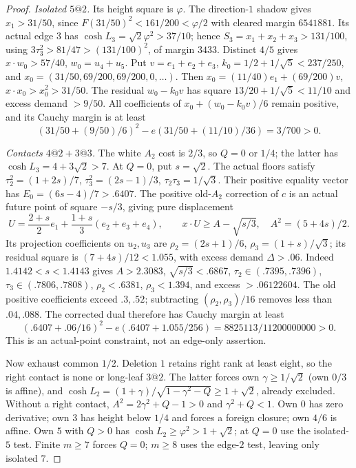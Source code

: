 \documentclass[11pt]{article}
\theoremstyle{remark}
\newcommand{\ph}{\varphi}
\begin{document}
\begin{proof}
\emph{Isolated $5@2$.}
Its height square is $\ph$. The direction-$1$ shadow gives
$x_1>31/50$, since $F(31/50)^2<161/200<\ph/2$ with cleared
margin $6541881$. Its actual edge $3$ has
$\cosh L_3=\sqrt2\ph^2>37/10$; hence
$S_3=x_1+x_2+x_3>131/100$, using
$3\tau_3^2>81/47>(131/100)^2$, of margin $3433$.
Distinct $4/5$ gives $x\cdot w_0>57/40$, $w_0=u_4+u_5$.
Put $v=e_1+e_2+e_3$, $k_0=1/2+1/\sqrt5<237/250$, and
$x_0=(31/50,69/200,69/200,0,\ldots)$.
Then $x_0=(11/40)e_1+(69/200)v$, $x\cdot x_0>x_0^2>31/50$.
The residual $w_0-k_0v$ has square $13/20+1/\sqrt5<11/10$
and excess demand $>9/50$.
All coefficients of $x_0+(w_0-k_0v)/6$ remain positive, and its
Cauchy margin is at least
\[
 (31/50+(9/50)/6)^2-e(31/50+(11/10)/36)=3/700>0.
\]

\emph{Contacts $4@2+3@3$.}
The white $A_2$ cost is $2/3$, so $Q=0$ or $1/4$; the latter has
$\cosh L_3=4+3\sqrt2>7$. At $Q=0$, put $s=\sqrt2$.
The actual floors satisfy
$\tau_2^2=(1+2s)/7$, $\tau_3^2=(2s-1)/3$,
$\tau_2\tau_3=1/\sqrt3$.
Their positive equality vector has $E_0=(6s-4)/7>.6407$.
The positive old-$A_2$ correction of $c$ is an actual future point
of square $-s/3$, giving pure displacement
\[
 U=\frac{2+s}{2}e_1+\frac{1+s}{3}(e_2+e_3+e_4),\qquad
 x\cdot U\ge A-\sqrt{s/3},\quad A^2=(5+4s)/2.
\]
Its projection coefficients on $u_2,u_3$ are
$\rho_2=(2s+1)/6$, $\rho_3=(1+s)/\sqrt3$;
its residual square is $(7+4s)/12<1.055$, with excess demand
$\Delta>.06$.
Indeed $1.4142<s<1.4143$ gives $A>2.3083$,
$\sqrt{s/3}<.6867$, $\tau_2\in(.7395,.7396)$,
$\tau_3\in(.7806,.7808)$, $\rho_2<.6381$, $\rho_3<1.394$,
and excess $>.06122604$.
The old positive coefficients exceed $.3,.52$; subtracting
$(\rho_2,\rho_3)/16$ removes less than $.04,.088$.
The corrected dual therefore has Cauchy margin at least
\[
 (.6407+.06/16)^2-e(.6407+1.055/256)
       =8825113/11200000000>0.
\]
This is an actual-point constraint, not an edge-only assertion.

Now exhaust common $1/2$. Deletion $1$ retains right rank at least
eight, so the right contact is none or long-leaf $3@2$.
The latter forces own $\gamma\ge1/\sqrt2$ (own $0/3$ is affine),
and $\cosh L_2=(1+\gamma)/\sqrt{1-\gamma^2-Q}\ge1+\sqrt2$,
already excluded. Without a right contact,
$A^2=2\gamma^2+Q-1>0$ and $\gamma^2+Q<1$.
Own $0$ has zero derivative; own $3$ has height below $1/4$ and
forces a foreign closure; own $4/6$ is affine.
Own $5$ with $Q>0$ has $\cosh L_2\ge\ph^2>1+\sqrt2$;
at $Q=0$ use the isolated-$5$ test. Finite $m\ge7$ forces $Q=0$;
$m\ge8$ uses the edge-$2$ test, leaving only isolated $7$.


\end{proof}
\end{document}
